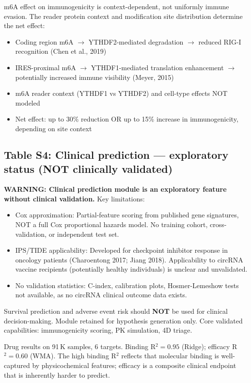 \small m6A effect on immunogenicity is context-dependent, not uniformly immune evasion. The reader protein context and modification site distribution determine the net effect:

\begin{itemize}[noitemsep,topsep=0pt]
\item Coding region m6A $\to$ YTHDF2-mediated degradation $\to$ reduced RIG-I recognition (Chen et al., 2019)
\item IRES-proximal m6A $\to$ YTHDF1-mediated translation enhancement $\to$ potentially increased immune visibility (Meyer, 2015)
\item m6A reader context (YTHDF1 vs YTHDF2) and cell-type effects NOT modeled
\item Net effect: up to 30\% reduction OR up to 15\% increase in immunogenicity, depending on site context
\end{itemize}

\subsection*{Table S4: Clinical prediction — exploratory status (NOT clinically validated)}

\small \textbf{WARNING: Clinical prediction module is an exploratory feature without clinical validation.} Key limitations:
\begin{itemize}[noitemsep,topsep=0pt]
\item Cox approximation: Partial-feature scoring from published gene signatures, NOT a full Cox proportional hazards model. No training cohort, cross-validation, or independent test set.
\item IPS/TIDE applicability: Developed for checkpoint inhibitor response in oncology patients (Charoentong 2017; Jiang 2018). Applicability to circRNA vaccine recipients (potentially healthy individuals) is unclear and unvalidated.
\item No validation statistics: C-index, calibration plots, Hosmer-Lemeshow tests not available, as no circRNA clinical outcome data exists.
\end{itemize}
Survival prediction and adverse event risk should \textbf{NOT} be used for clinical decision-making. Module retained for hypothesis generation only. Core validated capabilities: immunogenicity scoring, PK simulation, 4D triage.

\small Drug results on 91\,K samples, 6 targets. Binding R$^2{=}0.95$ (Ridge); efficacy R$^2{=}0.60$ (WMA). The high binding R$^2$ reflects that molecular binding is well-captured by physicochemical features; efficacy is a composite clinical endpoint that is inherently harder to predict.

